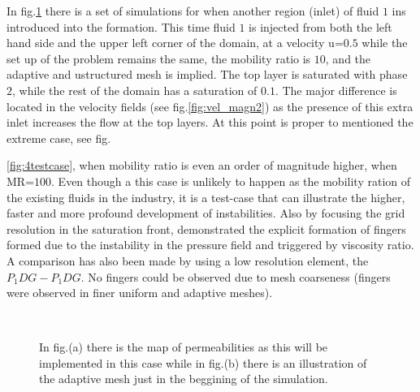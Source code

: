 \documentclass[preprint,authoryear,12pt]{elsarticle}
\begin{document}
In fig.\ref{fig:3testcase_a} there is a set of simulations for when another region (inlet) of fluid $1$ ins introduced into the formation. This time fluid $1$ is injected from both the left hand side and the upper left corner of the domain, at a velocity u=$0.5$ while the set up of the problem remains the same, the mobility ratio is $10$, and the adaptive and ustructured mesh is implied. The top layer is saturated with phase $2$, while the rest of the domain has a saturation of $0.1$. The major difference is located in the velocity fields (see fig.\ref{fig:vel_magn2}) as the presence of this extra inlet increases the flow at the top layers. At this point is proper to mentioned the extreme case, see fig.{\ref{fig:4testcase}, when mobility ratio is even an order of magnitude higher, when MR=$100$. Even though a this case is unlikely to happen as the mobility ration of the existing fluids in the industry, it is a test-case that can illustrate the higher, faster and more profound development of instabilities. Also by focusing the grid resolution in the saturation front, \citet{christou2015}  demonstrated the explicit formation of ﬁngers formed due to the instability in the pressure ﬁeld and triggered by viscosity ratio. A comparison has also been made by using a low resolution element, the $P_{1}DG-P_{1}DG$. No ﬁngers could be observed due to mesh coarseness (ﬁngers were observed in ﬁner uniform and adaptive meshes).

\begin{figure}
\centering
{}\\[2mm]%
%
\caption{In fig.(a) there is the map of permeabilities as this will be implemented in this case while in fig.(b) there is an illustration of the adaptive mesh just in the beggining of the simulation.}
\label{fig:3testcase_a}
\end{figure}

}
\end{document}
